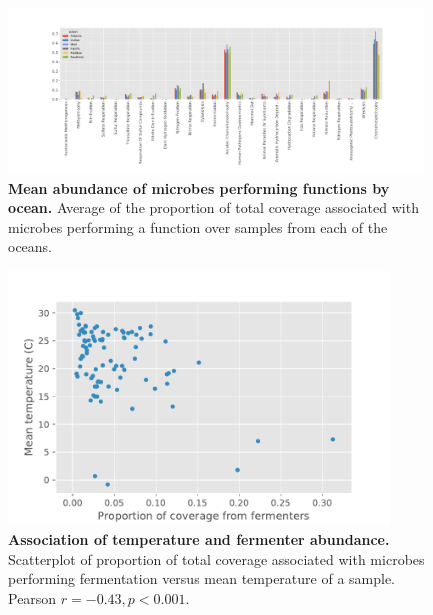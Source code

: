 \documentclass[10pt,letterpaper]{article}
\begin{document}
\begin{figure}
\includegraphics[width=0.98\textwidth]{oceans}
\caption{{\bf Mean abundance of microbes performing functions by ocean.}
Average of the proportion of total coverage associated with microbes performing a function over samples from each of the oceans.}
\label{oceans}
\end{figure}

\begin{figure}
\includegraphics[width=0.9\textwidth]{temp_corr_tara}
\caption{{\bf Association of temperature and fermenter abundance.}
Scatterplot of proportion of total coverage associated with microbes performing fermentation versus mean temperature of a sample. Pearson $r=-0.43, p<0.001$.}
\label{corr_tara}
\end{figure}
\end{document}
